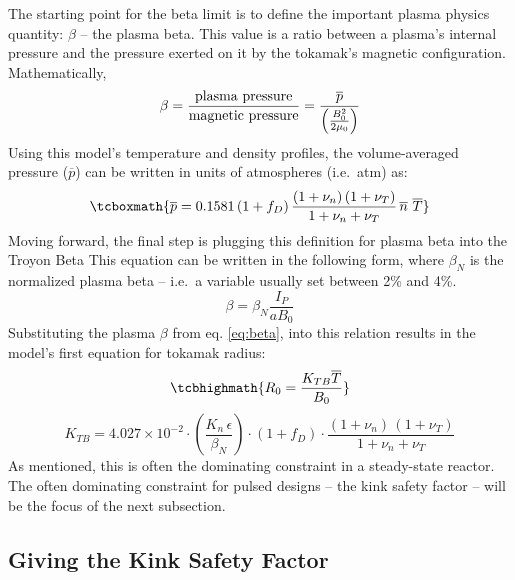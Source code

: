 The starting point for the beta limit is to define the important plasma physics quantity: $\beta$ -- the plasma beta. This value is a ratio between a plasma's internal pressure and the pressure exerted on it by the tokamak's magnetic configuration. Mathematically, \cite{jeff}
\begin{equation}
	\label{eq:beta}
	\beta = \frac{\textnormal{plasma pressure}}{\textnormal{magnetic pressure}} = \frac{ \overline p }{ \left( \frac{B_0^2}{2 \mu_0} \right) }
\end{equation}
Using this model's temperature and density profiles, the volume-averaged pressure ($\overline p$) can be written in units of atmospheres (i.e.\ atm) as:
\begin{equation}
\tcboxmath{
  \overline{p} = 0.1581 \, ( 1 + f_D ) \, \frac{ (1 + \nu_n) \, (1 + \nu_T) }{1 + \nu_n + \nu_T } \, \overline{n} \ \overline{T}
  }
\end{equation}
Moving forward, the final step is plugging this definition for plasma beta into the  Troyon Beta  This equation can be written in the following form, where $\beta_N$ is the normalized plasma beta -- i.e.\ a  variable usually set between 2\% and 4\%. \cite{hartmann}
\begin{equation}
	\beta = \beta_N \frac{ I_P }{ a B_0 }
\end{equation}
Substituting the plasma $\beta$ from eq. \ref{eq:beta}, into this relation results in the model's first equation for tokamak radius:
\begin{equation}
  \label{eq:r_beta}
  \tcbhighmath{ R_0 = \frac{ K_{TB} \overline{T} }{ B_0 } }
\end{equation} 
\begin{equation}
  K_{TB} = 4.027 \times 10^{-2} \cdot  \left( \frac{K_n \, \epsilon}{\beta_N} \right) \cdot ( 1 + f_D ) \cdot \frac{ (1 + \nu_n) \, (1 + \nu_T) }{1 + \nu_n + \nu_T }
\end{equation} 
As mentioned, this is often the dominating constraint in a steady-state reactor. The often dominating constraint for pulsed designs -- the kink safety factor -- will be the focus of the next subsection.

\subsection{Giving the Kink Safety Factor}

